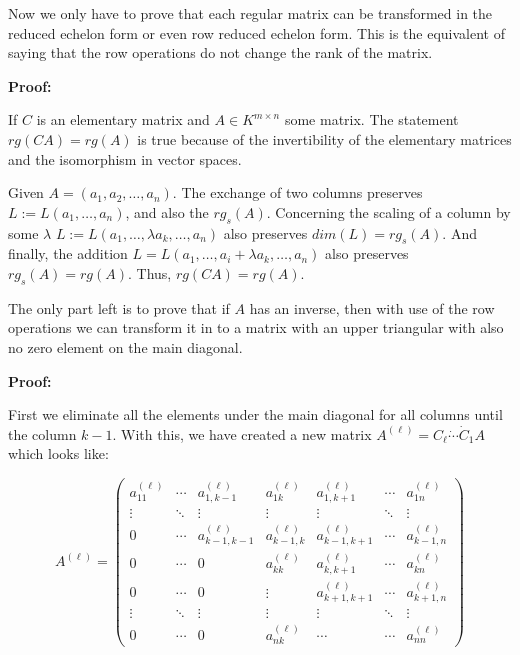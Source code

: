 \QED
\vspace{\baselineskip}

Now we only have to prove that each regular matrix can be transformed in the reduced echelon form or 
even row reduced echelon form. This is the equivalent of saying that the row operations do not change
the rank of the matrix.
\vspace{\baselineskip}

\textbf{Proof:}

If \(C\) is an elementary matrix and \(A \in K^{m \times n}\) some matrix. The statement \(rg(CA) = rg(A)\) 
is true because of the invertibility of the elementary matrices and the isomorphism in vector spaces.
\vspace{\baselineskip}

Given \(A = (a_1, a_2, \dots, a_n)\). The exchange of two columns preserves \(L := L(a_1, \dots, a_n)\), 
and also the \(rg_s (A)\). Concerning the scaling of a column by some \(\lambda \) \(L := L(a_1, \dots, \lambda a_k, \dots, a_n)\) 
also preserves \(dim(L) = rg_s(A)\). And finally, the addition \(L = L(a_1, \dots, a_i + \lambda a_k, \dots, a_n)\) also preserves 
\(rg_s (A) = rg(A)\). Thus, \(rg(CA) = rg(A)\).

\QED
\vspace{\baselineskip}

The only part left is to prove that if \(A\) has an inverse, then with use of the row operations we can 
transform it in to a matrix with an upper triangular with also no zero element on the main diagonal.
\vspace{\baselineskip}

\textbf{Proof:}

First we eliminate all the elements under the main diagonal for all columns until the column \(k - 1\).
With this, we have created a new matrix \(A^(\ell) = C_{\ell} \dot \cdots \dot C_1 A \) which looks 
like: 

\[
A^{(\ell)} =
\begin{pmatrix}
a^{(\ell)}_{11} & \cdots & a^{(\ell)}_{1,k-1} & a^{(\ell)}_{1k} & a^{(\ell)}_{1,k+1} & \cdots & a^{(\ell)}_{1n} \\
\vdots & \ddots & \vdots & \vdots & \vdots & \ddots & \vdots \\
0 & \cdots & a^{(\ell)}_{k-1,k-1} & a^{(\ell)}_{k-1,k} & a^{(\ell)}_{k-1,k+1} & \cdots & a^{(\ell)}_{k-1,n} \\
0 & \cdots & 0 & a^{(\ell)}_{kk} & a^{(\ell)}_{k,k+1} & \cdots & a^{(\ell)}_{kn} \\
0 & \cdots & 0 & \vdots & a^{(\ell)}_{k+1,k+1} & \cdots & a^{(\ell)}_{k+1,n} \\
\vdots & \ddots & \vdots & \vdots & \vdots & \ddots & \vdots \\
0 & \cdots & 0 & a^{(\ell)}_{nk} & \cdots & \cdots & a^{(\ell)}_{nn}
\end{pmatrix}
\]

